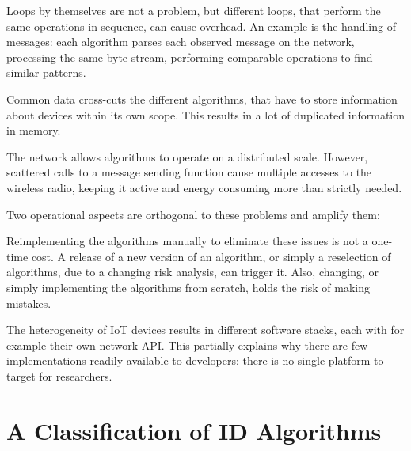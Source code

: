 \documentclass[conference]{IEEEtran}
\begin{document}
\begin{LaTeXdescription}

  \item[Loops] by themselves are not a problem, but different loops, that
  perform the same operations in sequence, can cause overhead. An example is
  the handling of messages: each algorithm parses each observed message on the
  network, processing the same byte stream, performing comparable operations to
  find similar patterns.

  \item[Common data] cross-cuts the different algorithms, that have to store
  information about devices within its own scope. This results in a lot of
  duplicated information in memory.

  \item[The network] allows algorithms to operate on a distributed scale.
  However, scattered calls to a message sending function cause multiple
  accesses to the wireless radio, keeping it active and energy consuming more
  than strictly needed.

\end{LaTeXdescription}

Two operational aspects are orthogonal to these problems and amplify them:

\begin{LaTeXdescription}
  
  \item[Reimplementing] the algorithms manually to eliminate these issues is
  not a one-time cost. A release of a new version of an algorithm, or simply a
  reselection of algorithms, due to a changing risk analysis, can trigger it.
  Also, changing, or simply implementing the algorithms from scratch, holds the
  risk of making mistakes.

  \item[The heterogeneity of IoT devices] results in different software stacks,
  each with for example their own network API\@. This partially explains why
  there are few implementations readily available to developers: there is no
  single platform to target for researchers.

\end{LaTeXdescription}

\section{A Classification of ID Algorithms}
\label{classification}
\end{document}
